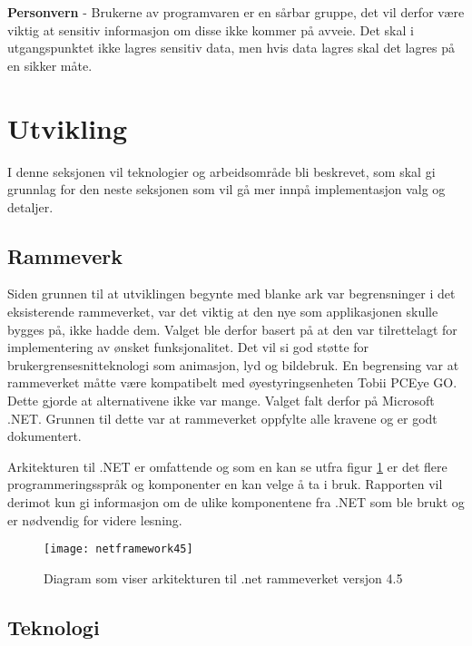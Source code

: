 \textbf{Personvern} - Brukerne av programvaren er en sårbar gruppe, det vil derfor være viktig at sensitiv informasjon om disse ikke kommer på avveie. Det skal i utgangspunktet ikke lagres sensitiv data, men hvis data lagres skal det lagres på en sikker måte. 
 
\section{Utvikling} 
 
I denne seksjonen vil teknologier og arbeidsområde bli beskrevet, som skal gi grunnlag for den neste seksjonen som vil gå mer innpå implementasjon valg og detaljer. 
 
 
\subsection{Rammeverk} 
 
 
Siden grunnen til at utviklingen begynte med blanke ark var begrensninger i det eksisterende rammeverket, var det viktig at den nye som applikasjonen skulle bygges på, ikke hadde dem. Valget ble derfor basert på at den var tilrettelagt for implementering av ønsket funksjonalitet. Det vil si god støtte for brukergrensesnitteknologi som animasjon, lyd og bildebruk. En begrensing var at rammeverket måtte være kompatibelt med øyestyringsenheten Tobii PCEye GO. Dette gjorde at alternativene ikke var mange.  
Valget falt derfor på Microsoft .NET. Grunnen til dette var at rammeverket oppfylte alle kravene og er godt dokumentert. 
 
 
Arkitekturen til .NET er omfattende og som en kan se utfra figur \ref{fig:net-arkitektur} er det flere programmeringsspråk og komponenter en kan velge å ta i bruk. Rapporten vil derimot kun gi informasjon om de ulike komponentene fra .NET som ble brukt og er nødvendig for videre lesning. 
 
 
\begin{figure}[ht] 
\centering 
\texttt{[image: netframework45]} 
\caption{Diagram som viser arkitekturen til .net rammeverket versjon 4.5} 
\label{fig:net-arkitektur} 
\end{figure} 
 
 
\subsection{Teknologi} 
 
